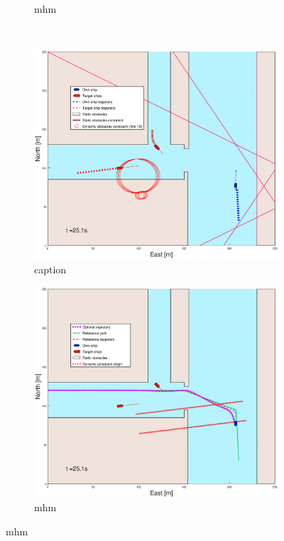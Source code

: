 \begin{figure}[!b]
\begin{subfigure}[b]{0.499\textwidth}
        \caption{mhm}
    \end{subfigure}
    \hfill
    \\
    \begin{subfigure}[b]{0.49\textwidth}
        \centering
        \includegraphics[width=\textwidth]{Images/Figures/Havn1/_Simple_1fig1_time=25}
        \caption{caption}
    \end{subfigure}
    \hfill
    \begin{subfigure}[b]{0.499\textwidth}
        \centering
        \includegraphics[width=\textwidth]{Images/Figures/Havn1/_Simple_1fig999_time=25}
        \caption{mhm}
    \end{subfigure}
    \hfill
\end{figure}%
